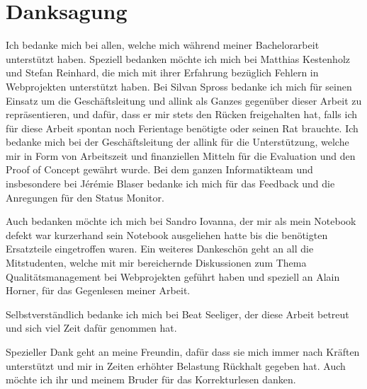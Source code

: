 \section{Danksagung}
\label{sec:danksagung}
Ich bedanke mich bei allen, welche mich während meiner Bachelorarbeit unterstützt haben. Speziell bedanken möchte ich mich bei Matthias Kestenholz und Stefan Reinhard, die mich mit ihrer Erfahrung bezüglich Fehlern in Webprojekten unterstützt haben. Bei Silvan Spross bedanke ich mich für seinen Einsatz um die Geschäftsleitung und allink als Ganzes gegenüber dieser Arbeit zu repräsentieren, und dafür, dass er mir stets den Rücken freigehalten hat, falls ich für diese Arbeit spontan noch Ferientage benötigte oder seinen Rat brauchte. Ich bedanke mich bei der Geschäftsleitung der allink für die Unterstützung, welche mir in Form von Arbeitszeit und finanziellen Mitteln für die Evaluation und den Proof of Concept gewährt wurde. Bei dem ganzen Informatikteam und insbesondere bei Jérémie Blaser bedanke ich mich für das Feedback und die Anregungen für den Status Monitor.

Auch bedanken möchte ich mich bei Sandro Iovanna, der mir als mein Notebook defekt war kurzerhand sein Notebook ausgeliehen hatte bis die benötigten Ersatzteile eingetroffen waren. Ein weiteres Dankeschön geht an all die Mitstudenten, welche mit mir bereichernde Diskussionen zum Thema Qualitätsmanagement bei Webprojekten geführt haben und speziell an Alain Horner, für das Gegenlesen meiner Arbeit.

Selbstverständlich bedanke ich mich bei Beat Seeliger, der diese Arbeit betreut und sich viel Zeit dafür genommen hat.

Spezieller Dank geht an meine Freundin, dafür dass sie mich immer nach Kräften unterstützt und mir in Zeiten erhöhter Belastung Rückhalt gegeben hat. Auch möchte ich ihr und meinem Bruder für das Korrekturlesen danken.
